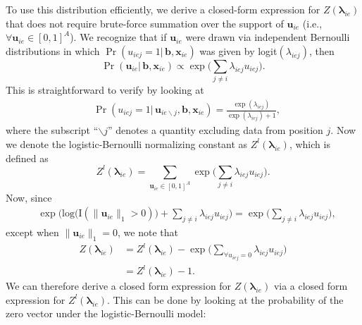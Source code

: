 \documentclass[ba]{imsart}
\numberwithin{equation}{section}
\theoremstyle{plain}
\begin{document}
	To use this distribution efficiently, we derive a closed-form expression for $Z(\boldsymbol{\lambda}_{ie})$ that does not require brute-force summation over the support of $\boldsymbol{u}_{ie}$ (i.e., $\forall \boldsymbol{u}_{ie} \in [0,1]^A$). We recognize that if $\boldsymbol{u}_{ie}$ were drawn via independent Bernoulli distributions in which $\Pr({u}_{iej}=1|\,\boldsymbol{b}, \boldsymbol{x}_{ie})$ was given by logit$(\lambda_{iej})$, then
	\begin{equation*}
		\Pr(\boldsymbol{u}_{ie}|\,\boldsymbol{b}, \boldsymbol{x}_{ie}) \propto \exp\Big(\sum_{j\neq i} \lambda_{iej}u_{iej}\Big).
	\end{equation*}
	This is straightforward to verify by looking at 
	\begin{equation*}
		\begin{aligned}
			&\Pr(u_{iej}=1|\,\boldsymbol{u}_{ie\backslash j}, \boldsymbol{b}, \boldsymbol{x}_{ie})
			=\frac{\exp{(\lambda_{iej})}}{\exp{(\lambda_{iej})} + 1},
		\end{aligned}\end{equation*}
		where the subscript ``$\backslash j$'' denotes a quantity excluding data from position $j$. Now we denote the logistic-Bernoulli normalizing constant as $Z^{l}(\boldsymbol{\lambda}_{ie})$, which is defined as 
		\begin{equation*}
			Z^{l}( \boldsymbol{\lambda}_{ie})=\sum_{\boldsymbol{u}_{ie} \in [0,1]^{A}} \exp\Big(\sum_{j\neq i} \lambda_{iej}u_{iej}\Big).
		\end{equation*}
		Now, since 
		\begin{equation*}
			\begin{aligned}
				&\exp\Big(\mbox{log}\Big(\text{I}(\lVert \boldsymbol{u}_{ie} \rVert_1 > 0)\Big) + \sum_{j\neq i} \lambda_{iej}u_{iej} \Big)= \exp\Big( \sum_{j \neq i} \lambda_{iej}u_{iej} \Big),
			\end{aligned}
		\end{equation*}
		except when $\lVert \boldsymbol{u}_{ie} \rVert_1=0$, we note that 
		\begin{equation*}
			\begin{aligned}
				Z(\boldsymbol{\lambda}_{ie})& = Z^{l}(\boldsymbol{\lambda}_{ie}) -\exp\Big( \sum\limits_{\forall u_{iej}=0}\lambda_{iej}u_{iej} \Big)
				\\& = Z^{l}(\boldsymbol{\lambda}_{ie}) -  1.
			\end{aligned}
		\end{equation*}
		We can therefore derive a closed form expression for $Z(\boldsymbol{\lambda}_{ie})$ via a closed form expression for $Z^{l}(\boldsymbol{\lambda}_{ie})$. This can be done by looking at the probability of the zero vector under the logistic-Bernoulli model:
\end{document}
